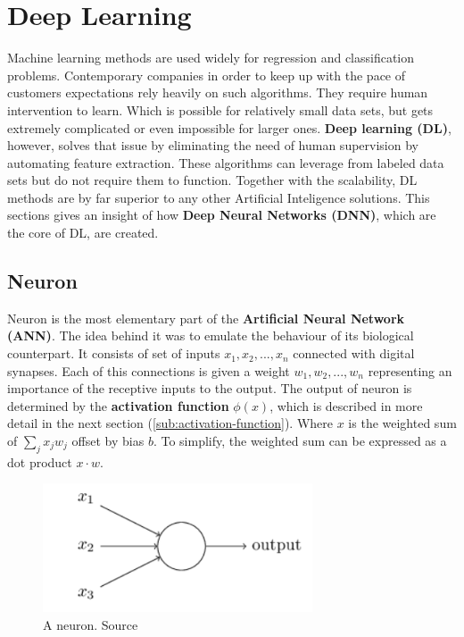 \chapter{Deep Learning}
\label{cha:dl}

Machine learning methods are used widely for regression and classification problems. Contemporary companies in order to keep up with the pace of customers expectations rely heavily on such algorithms. They require human intervention to learn. Which is possible for relatively small data sets, but gets extremely complicated or even impossible for larger ones. \textbf{Deep learning (DL)}, however, solves that issue by eliminating the need of human supervision by automating feature extraction. These algorithms can leverage from labeled data sets but do not require them to function. Together with the scalability, DL methods are by far superior to any other Artificial Inteligence solutions. This sections gives an insight of how \textbf{Deep Neural Networks (DNN)}, which are the core of DL, are created.


\section{Neuron}
\label{sec:neuron}

Neuron is the most elementary part of the \textbf{Artificial Neural Network (ANN)}. The idea behind it was to emulate the behaviour of its biological counterpart. It consists of set of inputs $x_1, x_2, ..., x_n$ connected with digital synapses. Each of this connections is given a weight $w_1, w_2, ..., w_n$ representing an importance of the receptive inputs to the output. The output of neuron is determined by the \textbf{activation function} $\phi(x)$, which is described in more detail in the next section (\ref{sub:activation-function}). Where $x$ is the weighted sum of $\sum_j {x_j}{w_j}$ offset by bias $b$. To simplify, the weighted sum can be expressed as a dot product $x \cdot w$.

\begin{figure}[h]
    \centering
    \includegraphics[width=8cm]{img/Perceptron.png}
    \caption{A neuron. Source \cite{NNandDL}}
    \label{fig:neuron}
\end{figure}

